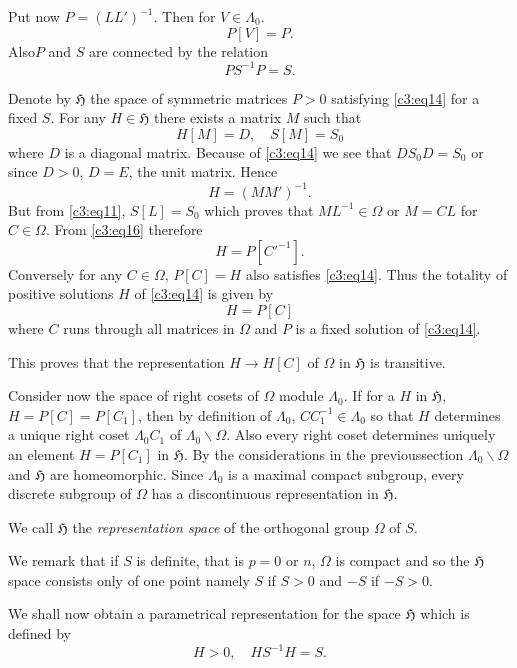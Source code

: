Put now $P=(LL')^{-1}$. Then for $V\in\Lambda_{0}$.
$$
P[V]=P.
$$
Also\pageoriginale $P$ and $S$ are connected by the relation
\begin{equation*}
PS^{-1}P=S.\tag{14}\label{c3:eq14}
\end{equation*}

Denote by $\mathfrak{H}$ the space of symmetric matrices $P>0$
satisfying \eqref{c3:eq14} for a fixed $S$. For any $H\in\mathfrak{H}$
there exists a matrix $M$ such that
\begin{equation*}
H[M]=D,\quad S[M]=S_{0}\tag{15}\label{c3:eq15}
\end{equation*}
where $D$ is a diagonal matrix. Because of \eqref{c3:eq14} we see that
$DS_{0}D=S_{0}$ or since $D>0$, $D=E$, the unit matrix. Hence
\begin{equation*}
H=(MM')^{-1}.\tag{16}\label{c3:eq16}
\end{equation*}
But from \eqref{c3:eq11}, $S[L]=S_{0}$ which proves that $ML^{-1}\in
\Omega$ or $M=CL$ for $C\in\Omega$. From \eqref{c3:eq16} therefore
$$
H=P[{C'}^{-1}].
$$
Conversely for any $C\in\Omega$, $P[C]=H$ also satisfies
\eqref{c3:eq14}. Thus the totality of positive solutions $H$ of \eqref{c3:eq14}
is given by
$$
H=P[C]
$$
where $C$ runs through all matrices in $\Omega$ and $P$ is a fixed
solution of \eqref{c3:eq14}.

This proves that the representation $H\to H[C]$ of $\Omega$ in
$\mathfrak{H}$ is transitive.

Consider now the space of right cosets of $\Omega$ module
$\Lambda_{0}$. If for a $H$ in $\mathfrak{H}$, $H=P[C]=P[C_{1}]$, then
by definition of $\Lambda_{0}$, $CC^{-1}_{1}\in\Lambda_{0}$ so that
$H$ determines a unique right coset $\Lambda_{0}C_{1}$ of
$\Lambda_{0}\backslash\Omega$. Also every right coset determines
uniquely an element $H=P[C_{1}]$ in $\mathfrak{H}$. By the
considerations in the previous\pageoriginale  section
$\Lambda_{0}\backslash\Omega$ and $\mathfrak{H}$ are
homeomorphic. Since $\Lambda_{0}$ is a maximal compact subgroup, every
discrete subgroup of $\Omega$ has a discontinuous representation in
$\mathfrak{H}$. 

We call $\mathfrak{H}$ the {\em representation space} of the
orthogonal group $\Omega$ of $S$.

We remark that if $S$ is definite, that is $p=0$ or $n$, $\Omega$ is
compact and so the $\mathfrak{H}$ space consists only of one point
namely $S$ if $S>0$ and $-S$ if $-S>0$.

We shall now obtain a parametrical representation for the space
$\mathfrak{H}$ which is defined by
\begin{equation*}
\boxed{H>0,\quad HS^{-1}H=S.}\tag{17}\label{c3:eq17}
\end{equation*}

